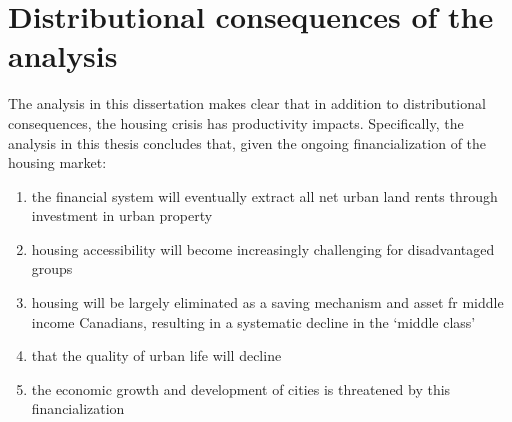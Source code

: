 %
%


\section{Distributional consequences of the analysis}
The analysis in this dissertation makes clear that in addition to distributional consequences, the housing crisis has productivity impacts. Specifically, the analysis in this thesis concludes that, given the ongoing financialization of the housing market:

\begin{enumerate}
\item the financial system will eventually extract all net urban land rents through investment in urban property
\item housing accessibility will become increasingly challenging for disadvantaged groups
\item housing will be largely eliminated as a saving mechanism and asset fr middle income Canadians,  resulting in a systematic decline in the `middle class'
\item that the quality of urban life will decline
\item the economic growth and development of cities is threatened by this financialization
\end{enumerate}


